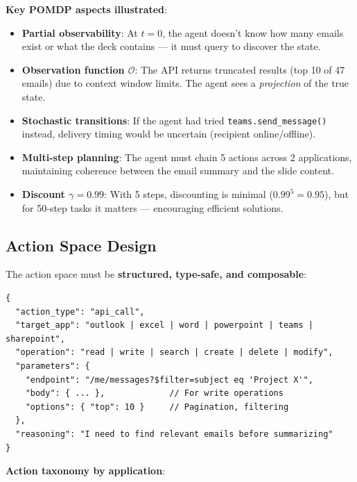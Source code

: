\begin{examplebox}
\textbf{Key POMDP aspects illustrated}:

\begin{itemize}
  \item \textbf{Partial observability}: At $t=0$, the agent doesn’t know how many emails exist or what the deck contains --- it must query to discover the state.
  \item \textbf{Observation function $\mathcal{O}$}: The API returns truncated results (top 10 of 47 emails) due to context window limits. The agent sees a \emph{projection} of the true state.
  \item \textbf{Stochastic transitions}: If the agent had tried \texttt{teams.send\_message()} instead, delivery timing would be uncertain (recipient online/offline).
  \item \textbf{Multi-step planning}: The agent must chain 5 actions across 2 applications, maintaining coherence between the email summary and the slide content.
  \item \textbf{Discount $\gamma=0.99$}: With 5 steps, discounting is minimal ($0.99^5 = 0.95$), but for 50-step tasks it matters --- encouraging efficient solutions.
\end{itemize}
\end{examplebox}

\subsection{Action Space Design}
\label{action-space-design}

The action space must be \textbf{structured, type-safe, and composable}:

\begin{examplebox}
\begin{lstlisting}[style=pythonstyle]
{
  "action_type": "api_call",
  "target_app": "outlook | excel | word | powerpoint | teams | sharepoint",
  "operation": "read | write | search | create | delete | modify",
  "parameters": {
    "endpoint": "/me/messages?$filter=subject eq 'Project X'",
    "body": { ... },             // For write operations
    "options": { "top": 10 }     // Pagination, filtering
  },
  "reasoning": "I need to find relevant emails before summarizing"
}
\end{lstlisting}
\end{examplebox}

\textbf{Action taxonomy by application}:


